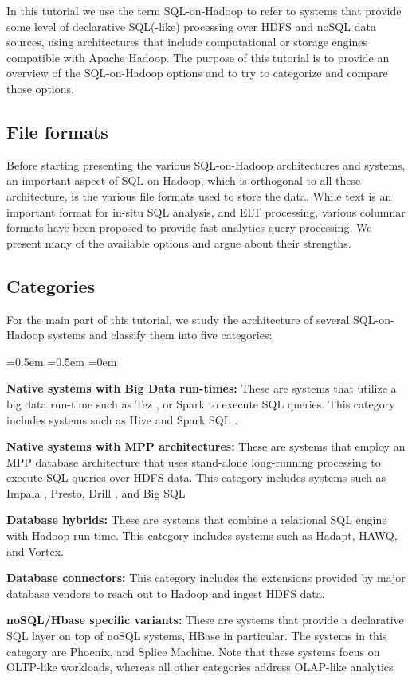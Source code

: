 \documentclass{vldb}
\newcounter{mycounter}
\begin{document}
In this tutorial we use the term SQL-on-Hadoop to refer to systems that provide some level of declarative SQL(-like) processing over HDFS and noSQL data sources, using architectures that include computational or storage engines compatible with Apache Hadoop. The purpose of this tutorial is to provide an overview of the SQL-on-Hadoop options and to try to categorize and compare those options.

\subsection{File formats}
Before starting presenting the various SQL-on-Hadoop architectures and systems, an important aspect of SQL-on-Hadoop, which is orthogonal to all these architecture, is the various file formats used to store the data. While text is an important format for in-situ SQL analysis, and ELT processing, various columnar formats have been proposed to provide fast analytics query processing. We present many of the available options and argue about their strengths.

\subsection{Categories}
For the main part of this tutorial, we study the architecture of several SQL-on-Hadoop systems and classify them into five categories:

\vspace{-2mm}
\setcounter{mycounter}{0}
\begin{list}{.}{\leftmargin=1.4em}
  \itemsep=0.5em
  \parsep=0.5em
  \parskip=0em
\item {{\bf Native systems with Big Data run-times:} These are systems that utilize a big data run-time such as Tez \cite{tezsigmod15}, or Spark \cite{sparkhotcloud10} to execute SQL queries. This category includes systems such as Hive \cite{hive} and Spark SQL \cite{sparkSQL}.}
\item{ {\bf Native systems with MPP architectures:} These are systems that employ an MPP database architecture that uses stand-alone long-running processing to execute SQL queries over HDFS data. This category includes systems such as Impala \cite{Kornacker+15}, Presto, Drill \cite{drill}, and Big SQL \cite{bigsql}}
\item{{\bf Database hybrids:} These are systems that combine a relational SQL engine with Hadoop run-time. This category includes systems such as Hadapt, HAWQ, and Vortex.}
\item{ {\bf Database connectors:} This category includes the extensions provided by major database vendors to reach out to Hadoop and ingest HDFS data.}
\item{ {\bf noSQL/Hbase specific variants:} These are systems that provide a declarative SQL layer on top of noSQL systems, HBase in particular. The systems in this category are Phoenix, and Splice Machine. Note that these systems focus on OLTP-like workloads, whereas all other categories address OLAP-like analytics}
\end{list}
\end{document}
